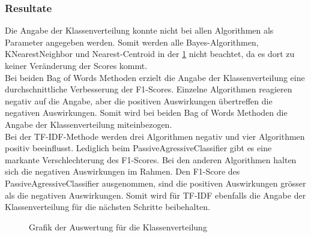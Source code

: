 \subsubsection{Resultate}
Die Angabe der Klassenverteilung konnte nicht bei allen Algorithmen als Parameter angegeben werden.
Somit werden alle Bayes-Algorithmen, KNearestNeighbor und Nearest-Centroid in der \cref{abb:classweight} nicht beachtet, da es dort zu keiner Veränderung der Scores kommt.\\
Bei beiden \glqq Bag of Words\grqq{} Methoden erzielt die Angabe der Klassenverteilung eine durchschnittliche Verbesserung der F1-Scores.
Einzelne Algorithmen reagieren negativ auf die Angabe, aber die positiven Auswirkungen übertreffen die negativen Auswirkungen.
Somit wird bei beiden \glqq Bag of Words\grqq{} Methoden die Angabe der Klassenverteilung miteinbezogen.\\
Bei der TF-IDF-Methode werden drei Algorithmen negativ und vier Algorithmen positiv beeinflusst.
Lediglich beim PassiveAgressiveClassifier gibt es eine markante Verschlechterung des F1-Scores.
Bei den anderen Algorithmen halten sich die negativen Auswirkungen im Rahmen.
Den F1-Score des PassiveAgressiveClassifier ausgenommen, sind die positiven Auswirkungen grösser als die negativen Auswirkungen.
Somit wird für TF-IDF ebenfalls die Angabe der Klassenverteilung für die nächsten Schritte beibehalten.
\begin{figure}[H]	
	\setlength{\fboxsep}{0.3pt} 
	\setlength{\fboxrule}{0.3pt} 
	\caption{Grafik der Auswertung für die Klassenverteilung}
	\label{abb:classweight}
\end{figure}
